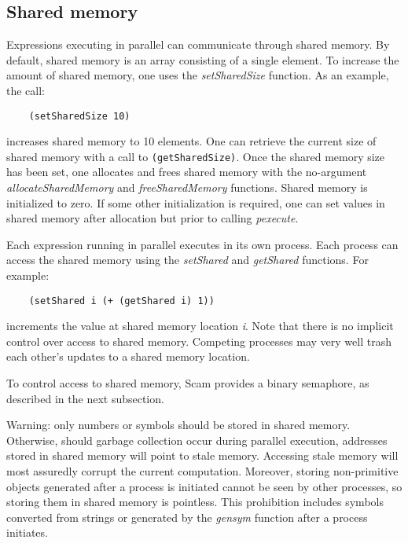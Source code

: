 \subsection{Shared memory}

Expressions executing in parallel can communicate through shared memory.
By default, shared memory is an array consisting of a single element.
To increase the amount of shared memory, one uses the {\it setSharedSize}
function.
As an example, the call:

\begin{verbatim}
    (setSharedSize 10)
\end{verbatim}

increases shared memory to 10 elements. One can retrieve the current size of
shared memory with a call to \verb!(getSharedSize)!.
Once the shared memory size has been set, one allocates and frees
shared memory with the no-argument {\it allocateSharedMemory}
and {\it freeSharedMemory}
functions.
Shared memory is initialized to zero. If some other initialization is
required, one can set values in shared memory after allocation but prior
to calling {\it pexecute}.

Each expression running in parallel executes in its own
process. Each process
can access the shared memory using the {\it setShared} and {\it getShared}
functions.  For example:

\begin{verbatim}
    (setShared i (+ (getShared i) 1))
\end{verbatim}

increments the value at shared memory location {\it i}. Note that there
is no implicit control over access to shared memory. Competing processes
may very well trash each other's updates to a shared memory location.

To control access to shared memory,
Scam provides a binary semaphore, as described
in the next subsection.

\color{red}
Warning:
\color{black}
only numbers or symbols should be stored in shared memory.
Otherwise, should garbage collection occur during parallel execution,
addresses stored in shared memory will point to stale memory.
Accessing stale memory
will most assuredly corrupt the current computation.
Moreover, storing non-primitive objects generated after a process 
is initiated cannot 
be seen by other processes, so storing them
in shared memory is pointless.
This prohibition includes symbols converted from strings or generated by the
{\it gensym} function after a process initiates.


